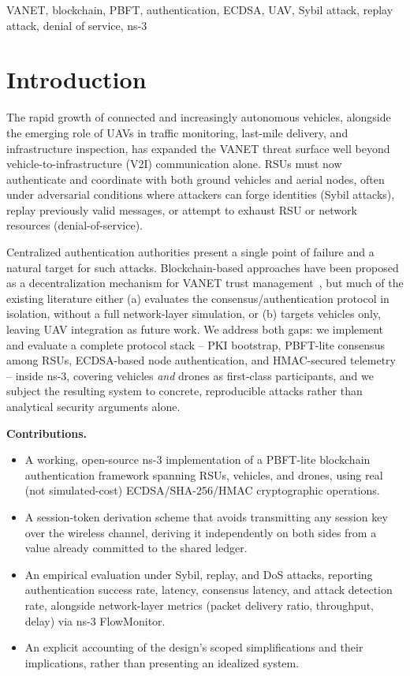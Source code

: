 \documentclass[conference]{IEEEtran}
\begin{document}
\begin{IEEEkeywords}
VANET, blockchain, PBFT, authentication, ECDSA, UAV, Sybil attack,
replay attack, denial of service, ns-3
\end{IEEEkeywords}

\section{Introduction}

The rapid growth of connected and increasingly autonomous vehicles,
alongside the emerging role of UAVs in traffic monitoring, last-mile
delivery, and infrastructure inspection, has expanded the VANET
threat surface well beyond vehicle-to-infrastructure (V2I)
communication alone. RSUs must now authenticate and coordinate with
both ground vehicles and aerial nodes, often under adversarial
conditions where attackers can forge identities (Sybil attacks),
replay previously valid messages, or attempt to exhaust RSU or
network resources (denial-of-service).

Centralized authentication authorities present a single point of
failure and a natural target for such attacks. Blockchain-based
approaches have been proposed as a decentralization mechanism for
VANET trust management~\cite{dorri2017blockchain,yang2018trust},
but much of the existing literature either (a) evaluates the
consensus/authentication protocol in isolation, without a full
network-layer simulation, or (b) targets vehicles only, leaving UAV
integration as future work. We address both gaps: we implement and
evaluate a complete protocol stack -- PKI bootstrap, PBFT-lite
consensus among RSUs, ECDSA-based node authentication, and
HMAC-secured telemetry -- inside ns-3, covering vehicles \emph{and}
drones as first-class participants, and we subject the resulting
system to concrete, reproducible attacks rather than analytical
security arguments alone.

\textbf{Contributions.}
\begin{itemize}
  \item A working, open-source ns-3 implementation of a PBFT-lite
  blockchain authentication framework spanning RSUs, vehicles, and
  drones, using real (not simulated-cost) ECDSA/SHA-256/HMAC
  cryptographic operations.
  \item A session-token derivation scheme that avoids transmitting
  any session key over the wireless channel, deriving it
  independently on both sides from a value already committed to the
  shared ledger.
  \item An empirical evaluation under Sybil, replay, and DoS attacks,
  reporting authentication success rate, latency, consensus latency,
  and attack detection rate, alongside network-layer metrics (packet
  delivery ratio, throughput, delay) via ns-3 FlowMonitor.
  \item An explicit accounting of the design's scoped simplifications
  and their implications, rather than presenting an idealized system.
\end{itemize}
\end{document}
